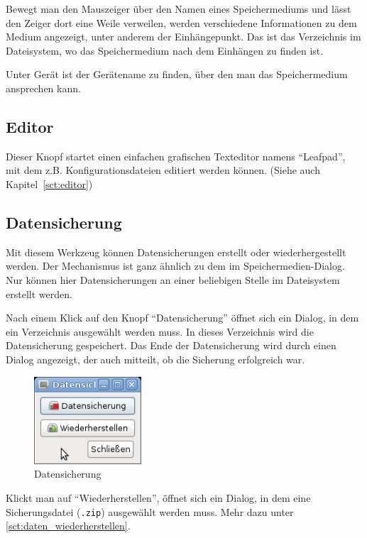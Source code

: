 \documentclass[a4paper,12pt,twoside]{article}
\begin{document}
Bewegt man den Mauszeiger über den Namen eines Speichermediums und lässt
den Zeiger dort eine Weile verweilen, werden verschiedene Informationen
zu dem Medium angezeigt, unter anderem der Einhängepunkt. Das ist das
Verzeichnis im Dateisystem, wo das Speichermedium nach dem Einhängen zu
finden ist.

Unter Gerät ist der Gerätename zu finden, über den man das
Speichermedium ansprechen kann.


\subsection{Editor}
\label{sct:gui_editor}
Dieser Knopf startet einen einfachen
grafischen Texteditor namens "`Leafpad"', mit
dem z.B. Konfigurationsdateien editiert werden können. (Siehe auch
Kapitel~\ref{sct:editor})


\subsection{Datensicherung}
\label{sct:dialog_datensicherung}
Mit diesem Werkzeug können
Datensicherungen erstellt oder wiederhergestellt werden. Der
Mechanismus ist ganz ähnlich zu dem im Speichermedien-Dialog. Nur
können hier Datensicherungen an einer beliebigen Stelle im Dateisystem
erstellt werden.

Nach einem Klick auf den Knopf
"`Datensicherung"' öffnet sich ein Dialog, in
dem ein Verzeichnis ausgewählt werden muss. In dieses Verzeichnis wird
die Datensicherung gespeichert. Das Ende der Datensicherung wird durch
einen Dialog angezeigt, der auch mitteilt, ob die Sicherung erfolgreich
war.

\begin{figure}
    \centering
    \includegraphics[width=4cm]{efaLivede-img/efaLivede-img21.png}
    \caption{Datensicherung}
    \label{fig:dialog_datensicherung}
\end{figure}

Klickt man auf "`Wiederherstellen"', öffnet
sich ein Dialog, in dem eine Sicherungsdatei (\texttt{.zip})
ausgewählt werden muss. Mehr dazu unter \ref{sct:daten_wiederherstellen}.
\end{document}
